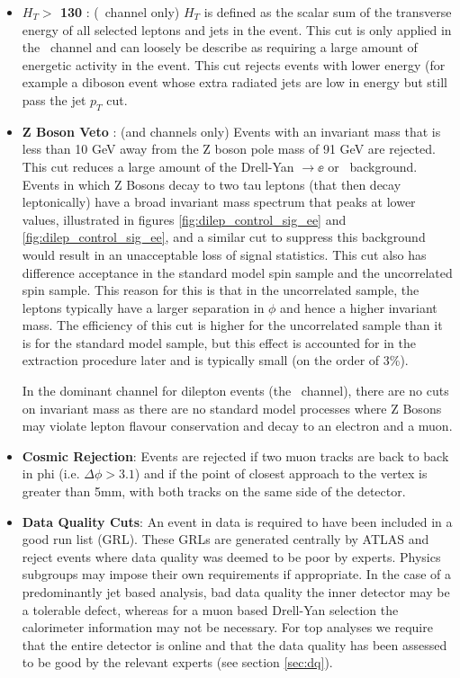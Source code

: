 \begin{itemize}
  \item \textbf{$H_T >$ 130 \GeV }: (\emu\ channel only) $H_T$ is defined as the scalar sum of the transverse energy of all selected leptons and jets in the event. This cut is only applied in the \emu\ channel and can loosely be describe as requiring a large amount of energetic activity in the event. This cut rejects events with lower energy (for example a diboson event whose extra radiated jets are low in energy but still pass the jet $p_T$ cut.

  \item \textbf{Z Boson Veto }: (\ee and \mumu channels only) Events with an invariant mass that is less than 10 GeV away from the Z boson pole mass of 91 GeV are rejected. This cut reduces a large amount of the Drell-Yan $\rightarrow \ee$ or \mumu\ background. Events in which Z Bosons decay to two tau leptons (that then decay leptonically) have a broad invariant mass spectrum that peaks at lower values, illustrated in figures \ref{fig:dilep_control_sig_ee} and \ref{fig:dilep_control_sig_ee}, and a similar cut to suppress this background would result in an unacceptable loss of signal statistics. This cut also has difference acceptance in the standard model spin sample and the uncorrelated spin sample. This reason for this is that in the uncorrelated sample, the leptons typically have a larger separation in $\phi$ and hence a higher invariant mass. The efficiency of this cut is higher for the uncorrelated sample than it is for the standard model sample, but this effect is accounted for in the extraction procedure later and is typically small (on the order of 3\%).

In the dominant channel for dilepton events (the \emu\ channel), there are no cuts on invariant mass as there are no standard model processes where Z Bosons may violate lepton flavour conservation and decay to an electron and a muon.

  \item \textbf{Cosmic Rejection}: Events are rejected if two muon tracks are back to back in phi (i.e. $\Delta\phi > 3.1$) and if the point of closest approach to the vertex is greater than 5mm, with both tracks on the same side of the detector. 

  \item \textbf{Data Quality Cuts}: An event in data is required to have been included in a good run list (GRL). These GRLs are generated centrally by ATLAS and reject events where data quality was deemed to be poor by experts. Physics subgroups may impose their own requirements if appropriate. In the case of a predominantly jet based analysis, bad data quality the inner detector may be a tolerable defect, whereas for a muon based Drell-Yan selection the calorimeter information may not be necessary. For top analyses we require that the entire detector is online and that the data quality has been assessed to be good by the relevant experts (see section \ref{sec:dq}).


\end{itemize}

